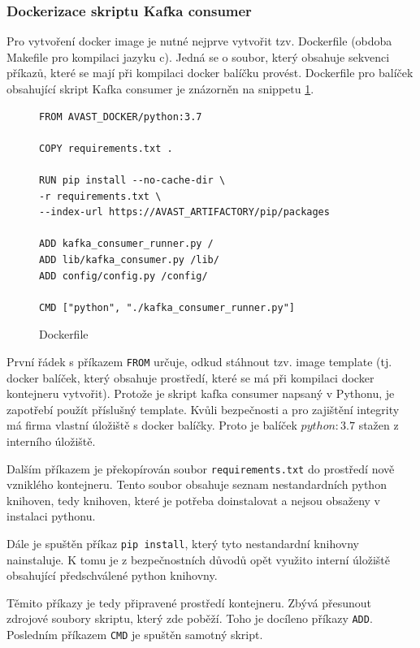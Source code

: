 \documentclass[thesis=M,czech,hidelinks]{FITthesis}[2013/05/06]
\begin{document}
\subsubsection{Dockerizace skriptu Kafka consumer} 
Pro vytvoření docker image je nutné nejprve vytvořit tzv. Dockerfile (obdoba Makefile pro kompilaci jazyku c). Jedná se o soubor, který obsahuje sekvenci příkazů, které se mají při kompilaci docker balíčku provést. Dockerfile pro balíček obsahující skript Kafka consumer je znázorněn na snippetu \ref{snip:docker}.

\begin{figure}[h]               
	\begin{verbatim}
FROM AVAST_DOCKER/python:3.7

COPY requirements.txt .

RUN pip install --no-cache-dir \
-r requirements.txt \
--index-url https://AVAST_ARTIFACTORY/pip/packages

ADD kafka_consumer_runner.py /
ADD lib/kafka_consumer.py /lib/
ADD config/config.py /config/

CMD ["python", "./kafka_consumer_runner.py"]
	\end{verbatim}      
	\caption{Dockerfile}
	\label{snip:docker}
\end{figure}

První řádek s příkazem \texttt{FROM} určuje, odkud stáhnout tzv. image template (tj. docker balíček, který obsahuje prostředí, které se má při kompilaci docker kontejneru vytvořit). Protože je skript kafka consumer napsaný v Pythonu, je zapotřebí použít příslušný template. Kvůli bezpečnosti a pro zajištění integrity má firma vlastní úložiště s docker balíčky. Proto je balíček $python:3.7$ stažen z interního úložiště.

Dalším příkazem je překopírován soubor \texttt{requirements.txt} do prostředí nově vzniklého kontejneru. Tento soubor obsahuje seznam nestandardních python knihoven, tedy knihoven, které je potřeba doinstalovat a nejsou obsaženy v instalaci pythonu.

Dále je spuštěn příkaz \texttt{pip install}, který tyto nestandardní knihovny nainstaluje. K tomu je z bezpečnostních důvodů opět využito interní úložiště obsahující předschválené python knihovny.

Těmito příkazy je tedy připravené prostředí kontejneru. Zbývá přesunout zdrojové soubory skriptu, který zde poběží. Toho je docíleno příkazy \texttt{ADD}. Posledním příkazem \texttt{CMD} je spuštěn samotný skript.
\end{document}
